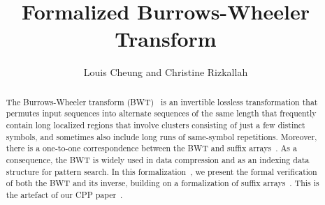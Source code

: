 \documentclass[11pt,a4paper]{article}
\begin{document}
\title{Formalized Burrows-Wheeler Transform}
\author{Louis Cheung and Christine Rizkallah}
\maketitle

\begin{abstract}
The Burrows-Wheeler transform (BWT)~\cite{Burrows_Tech_1994} is an invertible lossless
transformation that permutes input sequences into alternate sequences
of the same length that frequently contain long localized regions
that involve clusters consisting of just a few distinct symbols, and
sometimes also include long runs of same-symbol repetitions.
Moreover, there is a one-to-one correspondence between the BWT and suffix arrays~\cite{Manber_SIAM_1993}.
As a consequence, the BWT is widely used in data compression
and as an indexing data structure for pattern search.
In this formalization~\cite{Cheung_Zenodo_2024}, we present the formal verification of both the
BWT and its inverse,
building on a formalization of suffix arrays~\cite{Cheung_AFP_2024}.
This is the artefact of our CPP paper~\cite{Cheung_CPP_2025}.
\end{abstract}

\tableofcontents





\end{document}
